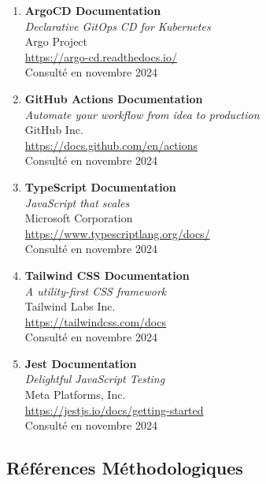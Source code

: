 \begin{enumerate}
    \item \textbf{ArgoCD Documentation} \\
    \textit{Declarative GitOps CD for Kubernetes} \\
    Argo Project \\
    \url{https://argo-cd.readthedocs.io/} \\
    Consulté en novembre 2024

    \item \textbf{GitHub Actions Documentation} \\
    \textit{Automate your workflow from idea to production} \\
    GitHub Inc. \\
    \url{https://docs.github.com/en/actions} \\
    Consulté en novembre 2024

    \item \textbf{TypeScript Documentation} \\
    \textit{JavaScript that scales} \\
    Microsoft Corporation \\
    \url{https://www.typescriptlang.org/docs/} \\
    Consulté en novembre 2024

    \item \textbf{Tailwind CSS Documentation} \\
    \textit{A utility-first CSS framework} \\
    Tailwind Labs Inc. \\
    \url{https://tailwindcss.com/docs} \\
    Consulté en novembre 2024

    \item \textbf{Jest Documentation} \\
    \textit{Delightful JavaScript Testing} \\
    Meta Platforms, Inc. \\
    \url{https://jestjs.io/docs/getting-started} \\
    Consulté en novembre 2024
\end{enumerate}

\subsection{Références Méthodologiques}

